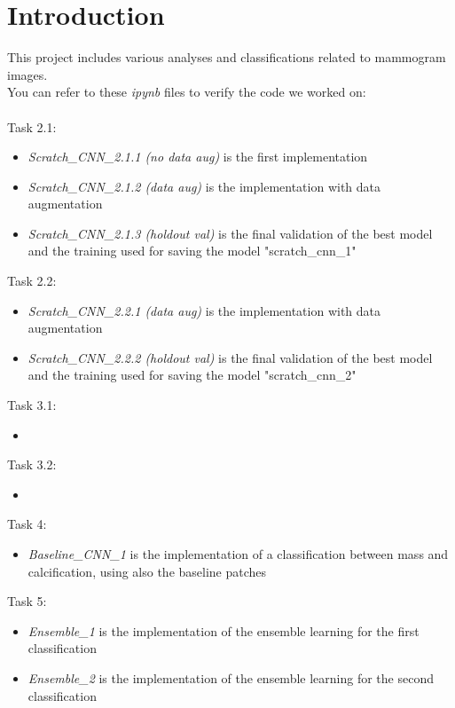 \documentclass[11pt,a4paper,oneside]{article}
\begin{document}
\baselineskip 22pt


\tableofcontents\thispagestyle{empty}\clearpage

\section{Introduction}
\baselineskip 12pt

This project includes various analyses and classifications related to mammogram images. \\
You can refer to these \textit{ipynb} files to verify the code we worked on:\\ \\
Task 2.1:
\begin{itemize}
\item \textit{Scratch\_CNN\_2.1.1 (no data aug)} is the first implementation
\item \textit{Scratch\_CNN\_2.1.2 (data aug)} is the implementation with data augmentation
\item \textit{Scratch\_CNN\_2.1.3 (holdout val)} is the final validation of the best model and the training used for saving the model "scratch\_cnn\_1"
\end{itemize}
Task 2.2:
\begin{itemize}
\item \textit{Scratch\_CNN\_2.2.1 (data aug)} is the implementation with data augmentation
\item \textit{Scratch\_CNN\_2.2.2 (holdout val)} is the final validation of the best model and the training used for saving the model "scratch\_cnn\_2"
\end{itemize}
Task 3.1:
\begin{itemize}
\item 
\end{itemize}
Task 3.2:
\begin{itemize}
\item 
\end{itemize}
Task 4:
\begin{itemize}
\item \textit{Baseline\_CNN\_1} is the implementation of a classification between mass and calcification, using also the baseline patches
\end{itemize}
Task 5:
\begin{itemize}
\item \textit{Ensemble\_1} is the implementation of the ensemble learning for the first classification
\item \textit{Ensemble\_2} is the implementation of the ensemble learning for the second classification
\end{itemize}
\end{document}
